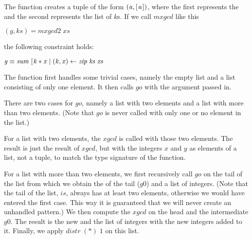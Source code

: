 \documentclass{scrreprt}
\newcommand{\Varid}[1]{\mathit{#1}}
\newcommand{\plus}{\mathbin{+\!\!\!+}}
\def\resethooks{%
  \global\let\SaveRestoreHook\empty
  \global\let\ColumnHook\empty}
\begin{document}
\begin{minipage}{\textwidth}
\)\par\noindent\endgroup\resethooks
\end{minipage}

The function creates a tuple of the form \ensuremath{(\Varid{a},[\mskip1.5mu \Varid{a}\mskip1.5mu])},
where the first represents the  and the
second represents the list of $k$s.
If we call \ensuremath{\Varid{mxgcd}} like this

\ensuremath{(\Varid{g},\Varid{ks})\mathrel{=}\Varid{mxgcd2}\;\Varid{xs}}

the following constraint holds:

\ensuremath{\Varid{g}\equiv \Varid{sum}\;[\mskip1.5mu \Varid{k}\mathbin{*}\Varid{x}\mid (\Varid{k},\Varid{x})\leftarrow \Varid{zip}\;\Varid{ks}\;\Varid{xs}}

The function first handles some trivial cases,
namely the empty list and a list consisting of
only one element. It then calls \ensuremath{\Varid{go}} with
the argument passed in.

There are two cases for \ensuremath{\Varid{go}}, namely
a list with two elements and a list
with more than two elements. (Note
that \ensuremath{\Varid{go}} is never called with only one
or no element in the list.)

For a list with two elements,
the \ensuremath{\Varid{xgcd}} is called with those two elements.
The result is just the result of \ensuremath{\Varid{xgcd}},
but with the integers $x$ and $y$ as
elements of a list, not a tuple, to
match the type signature of the function.

For a list with more than two elements,
we first recursively call \ensuremath{\Varid{go}} on the
tail of the list from which
we obtain the  of the tail (\ensuremath{\Varid{g0}})
and a list of integers.  (Note that
the tail of the list, $is$, always has at least
two elements, otherwise we would have entered
the first case. This way it is guaranteed
that we will never create an unhandled pattern.)
We then compute
the \ensuremath{\Varid{xgcd}} on the head and the intermediate \ensuremath{\Varid{g0}}.
The result is the new  and the list
of integers with the new integers added to it.
Finally, we apply \ensuremath{\Varid{distr}\;(\mathbin{*})\;\mathrm{1}} on this list.
\end{document}
